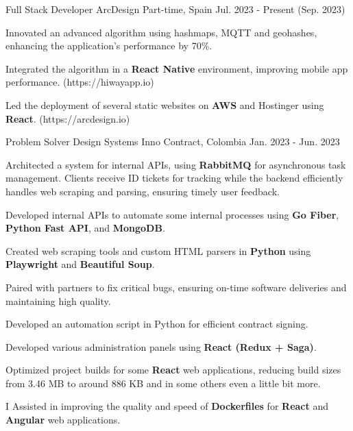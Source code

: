 \begin{cventries}
  \cventry
  {Full Stack Developer} %
  {ArcDesign} %
  {Part-time, Spain} %
  {Jul. 2023 - Present (Sep. 2023)} %
  {
    \begin{cvitems} %
      \item {Innovated an advanced algorithm using hashmaps, MQTT and geohashes, enhancing the application's performance by 70\%.}
      \item {Integrated the algorithm in a \textbf{React Native} environment, improving mobile app performance. (https://hiwayapp.io)}
      \item {Led the deployment of several static websites on \textbf{AWS} and Hostinger using \textbf{React}. (https://arcdesign.io)}
    \end{cvitems}
  }
  \cventry
  {Problem Solver} %
  {Design Systems Inno} %
  {Contract, Colombia} %
  {Jan. 2023 - Jun. 2023} %
  {
    \begin{cvitems} %
      \item {Architected a system for internal APIs, using \textbf{RabbitMQ} for asynchronous task management. Clients receive ID tickets for tracking while the backend efficiently handles web scraping and parsing, ensuring timely user feedback.}
      \item {Developed internal APIs to automate some internal processes using \textbf{Go Fiber}, \textbf{Python Fast API}, and \textbf{MongoDB}.}
      \item {Created web scraping tools and custom HTML parsers in \textbf{Python} using \textbf{Playwright} and \textbf{Beautiful Soup}.}
      \item {Paired with partners to fix critical bugs, ensuring on-time software deliveries and maintaining high quality.}
      \item {Developed an automation script in Python for efficient contract signing.}
      \item {Developed various administration panels using \textbf{React (Redux + Saga)}.}
      \item {Optimized project builds for some \textbf{React} web applications, reducing build sizes from 3.46 MB to around 886 KB and in some others even a little bit more.}
      \item {I Assisted in improving the quality and speed of \textbf{Dockerfiles} for \textbf{React} and \textbf{Angular} web applications.}
    \end{cvitems}
  }


\end{cventries}
